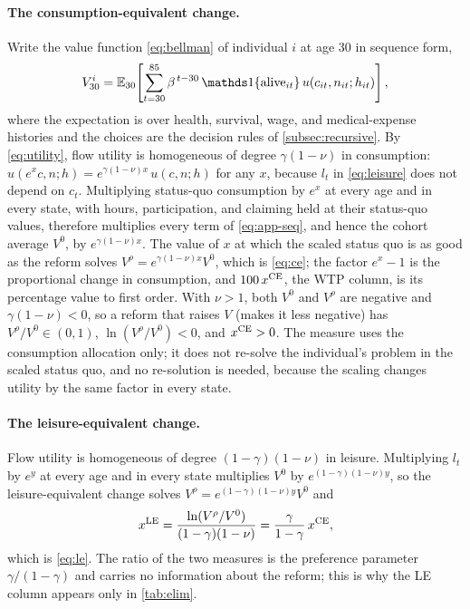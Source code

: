 \paragraph{The consumption-equivalent change.}
Write the value function \eqref{eq:bellman} of individual $i$ at age 30 in sequence form,
\begin{equation}\label{eq:app-seq}
V^{i}_{30}=\E_{30}\!\left[\sum_{t=30}^{85}\beta^{\,t-30}\,\ind{\text{alive}_{it}}\,u(c_{it},n_{it};h_{it})\right],
\end{equation}
where the expectation is over health, survival, wage, and medical-expense histories and the choices are the decision rules of \autoref{subsec:recursive}. By \eqref{eq:utility}, flow utility is homogeneous of degree $\gamma(1-\nu)$ in consumption: $u(e^{x}c,n;h)=e^{\gamma(1-\nu)x}\,u(c,n;h)$ for any $x$, because $l_t$ in \eqref{eq:leisure} does not depend on $c_t$. Multiplying status-quo consumption by $e^{x}$ at every age and in every state, with hours, participation, and claiming held at their status-quo values, therefore multiplies every term of \eqref{eq:app-seq}, and hence the cohort average $V^{0}$, by $e^{\gamma(1-\nu)x}$. The value of $x$ at which the scaled status quo is as good as the reform solves $V^{\rho}=e^{\gamma(1-\nu)x}V^{0}$, which is \eqref{eq:ce}; the factor $e^{x}-1$ is the proportional change in consumption, and $100\,x^{\mathrm{CE}}$, the WTP column, is its percentage value to first order. With $\nu>1$, both $V^{0}$ and $V^{\rho}$ are negative and $\gamma(1-\nu)<0$, so a reform that raises $V$ (makes it less negative) has $V^{\rho}/V^{0}\in(0,1)$, $\ln(V^{\rho}/V^{0})<0$, and $x^{\mathrm{CE}}>0$.
The measure uses the consumption allocation only; it does not re-solve the individual's problem in the scaled status quo, and no re-solution is needed, because the scaling changes utility by the same factor in every state.

\paragraph{The leisure-equivalent change.}
Flow utility is homogeneous of degree $(1-\gamma)(1-\nu)$ in leisure. Multiplying $l_t$ by $e^{y}$ at every age and in every state multiplies $V^{0}$ by $e^{(1-\gamma)(1-\nu)y}$, so the leisure-equivalent change solves $V^{\rho}=e^{(1-\gamma)(1-\nu)y}V^{0}$ and
\begin{equation}\label{eq:app-le}
x^{\mathrm{LE}}=\frac{\ln(V^{\rho}/V^{0})}{(1-\gamma)(1-\nu)}=\frac{\gamma}{1-\gamma}\,x^{\mathrm{CE}},
\end{equation}
which is \eqref{eq:le}. The ratio of the two measures is the preference parameter $\gamma/(1-\gamma)$ and carries no information about the reform; this is why the LE column appears only in \autoref{tab:elim}.

